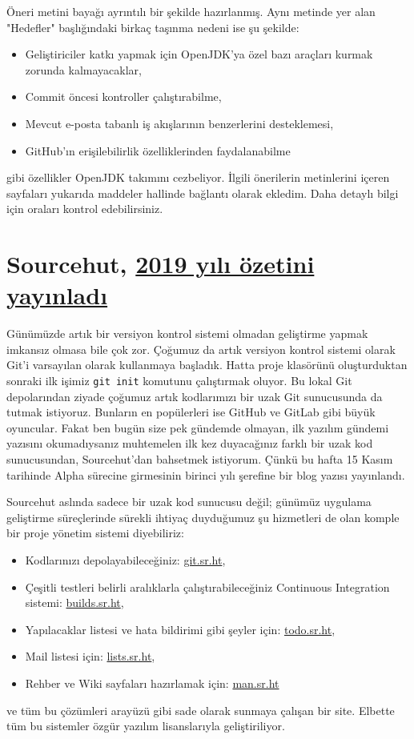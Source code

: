 \documentclass[11pt]{article}
\begin{document}
Öneri metini bayağı ayrıntılı bir şekilde hazırlanmış. Aynı metinde yer alan
"Hedefler" başlığındaki birkaç taşınma nedeni ise şu şekilde:
\begin{itemize}
\item Geliştiriciler katkı yapmak için OpenJDK'ya özel bazı araçları kurmak
zorunda kalmayacaklar,
\item Commit öncesi kontroller çalıştırabilme,
\item Mevcut e-posta tabanlı iş akışlarının benzerlerini desteklemesi,
\item GitHub'ın erişilebilirlik özelliklerinden faydalanabilme
\end{itemize}
gibi özellikler OpenJDK takımını cezbeliyor. İlgili önerilerin metinlerini
içeren sayfaları yukarıda maddeler hallinde bağlantı olarak ekledim. Daha
detaylı bilgi için oraları kontrol edebilirsiniz.
\section{Sourcehut, \href{https://sourcehut.org/blog/2019-11-15-sourcehut-1-year-alpha/\#expectations-for-2020}{2019 yılı özetini yayınladı}}
\label{sec:org6c19d9f}
Günümüzde artık bir versiyon kontrol sistemi olmadan geliştirme yapmak imkansız
olmasa bile çok zor. Çoğumuz da artık versiyon kontrol sistemi olarak Git'i
varsayılan olarak kullanmaya başladık. Hatta proje klasörünü oluşturduktan
sonraki ilk işimiz \texttt{git init} komutunu çalıştırmak oluyor. Bu lokal Git
depolarından ziyade çoğumuz artık kodlarımızı bir uzak Git sunucusunda da
tutmak istiyoruz. Bunların en popülerleri ise GitHub ve GitLab gibi büyük
oyuncular. Fakat ben bugün size pek gündemde olmayan, ilk yazılım gündemi
yazısını okumadıysanız muhtemelen ilk kez duyacağınız farklı bir uzak kod
sunucusundan, Sourcehut'dan bahsetmek istiyorum. Çünkü bu hafta 15 Kasım
tarihinde Alpha sürecine girmesinin birinci yılı şerefine bir blog yazısı
yayınlandı.

Sourcehut aslında sadece bir uzak kod sunucusu değil; günümüz uygulama
geliştirme süreçlerinde sürekli ihtiyaç duyduğumuz şu hizmetleri de olan komple
bir proje yönetim sistemi diyebiliriz:
\begin{itemize}
\item Kodlarınızı depolayabileceğiniz: \href{https://git.sr.ht/}{git.sr.ht},
\item Çeşitli testleri belirli aralıklarla çalıştırabileceğiniz Continuous
Integration sistemi: \href{https://builds.sr.ht/}{builds.sr.ht},
\item Yapılacaklar listesi ve hata bildirimi gibi şeyler için: \href{https://todo.sr.ht/}{todo.sr.ht},
\item Mail listesi için: \href{https://lists.sr.ht/}{lists.sr.ht},
\item Rehber ve Wiki sayfaları hazırlamak için: \href{https://man.sr.ht/}{man.sr.ht}
\end{itemize}
ve tüm bu çözümleri arayüzü gibi sade olarak sunmaya çalışan bir site. Elbette
tüm bu sistemler özgür yazılım lisanslarıyla geliştiriliyor.
\end{document}
